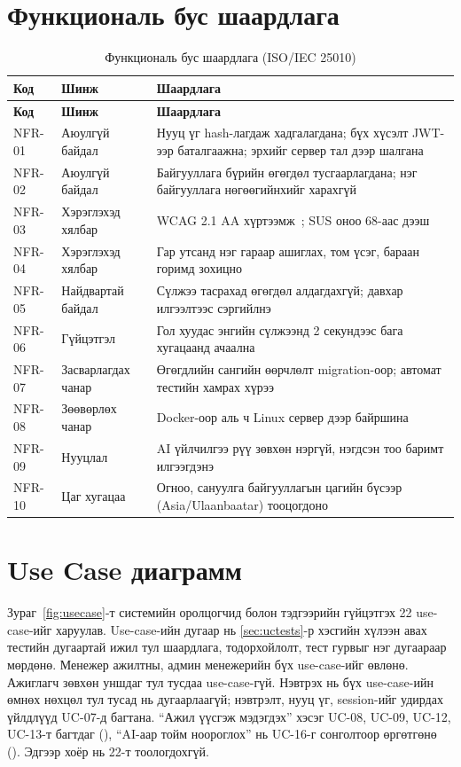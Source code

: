 \section{Функциональ бус шаардлага}
\begin{longtable}{|p{1.6cm}|p{3.2cm}|p{9.6cm}|}
\caption{Функциональ бус шаардлага (ISO/IEC 25010)}\label{table:nfr}\\ \hline
\textbf{Код} & \textbf{Шинж} & \textbf{Шаардлага} \\ \hline
\endfirsthead
\hline
\textbf{Код} & \textbf{Шинж} & \textbf{Шаардлага} \\ \hline
\endhead
NFR-01 & Аюулгүй байдал & Нууц үг hash-лагдаж хадгалагдана; бүх хүсэлт JWT-ээр баталгаажна; эрхийг сервер тал дээр шалгана \\ \hline
NFR-02 & Аюулгүй байдал & Байгууллага бүрийн өгөгдөл тусгаарлагдана; нэг байгууллага нөгөөгийнхийг харахгүй \\ \hline
NFR-03 & Хэрэглэхэд хялбар & WCAG 2.1 AA хүртээмж~\cite{wcag}; SUS оноо 68-аас дээш~\cite{brooke} \\ \hline
NFR-04 & Хэрэглэхэд хялбар & Гар утсанд нэг гараар ашиглах, том үсэг, бараан горимд зохицно \\ \hline
NFR-05 & Найдвартай байдал & Сүлжээ тасрахад өгөгдөл алдагдахгүй; давхар илгээлтээс сэргийлнэ \\ \hline
NFR-06 & Гүйцэтгэл & Гол хуудас энгийн сүлжээнд 2 секундээс бага хугацаанд ачаална \\ \hline
NFR-07 & Засварлагдах чанар & Өгөгдлийн сангийн өөрчлөлт migration-оор; автомат тестийн хамрах хүрээ \\ \hline
NFR-08 & Зөөвөрлөх чанар & Docker-оор аль ч Linux сервер дээр байршина \\ \hline
NFR-09 & Нууцлал & AI үйлчилгээ рүү зөвхөн нэргүй, нэгдсэн тоо баримт илгээгдэнэ \\ \hline
NFR-10 & Цаг хугацаа & Огноо, сануулга байгууллагын цагийн бүсээр (Asia/Ulaanbaatar) тооцогдоно \\ \hline
\end{longtable}

\section{Use Case диаграмм}
Зураг~\ref{fig:usecase}-т системийн оролцогчид болон тэдгээрийн гүйцэтгэх 22 use-case-ийг харуулав. Use-case-ийн дугаар нь \ref{sec:uctests}-р хэсгийн хүлээн авах тестийн дугаартай ижил тул шаардлага, тодорхойлолт, тест гурвыг нэг дугаараар мөрдөнө. Менежер ажилтны, админ менежерийн бүх use-case-ийг өвлөнө. Ажиглагч зөвхөн уншдаг тул тусдаа use-case-гүй. Нэвтрэх нь бүх use-case-ийн өмнөх нөхцөл тул тусад нь дугаарлаагүй; нэвтрэлт, нууц үг, session-ийг удирдах үйлдлүүд UC-07-д багтана. ``Ажил үүсгэж мэдэгдэх'' хэсэг UC-08, UC-09, UC-12, UC-13-т багтдаг (), ``AI-аар тойм ноороглох'' нь UC-16-г сонголтоор өргөтгөнө (). Эдгээр хоёр нь 22-т тоологдохгүй.

